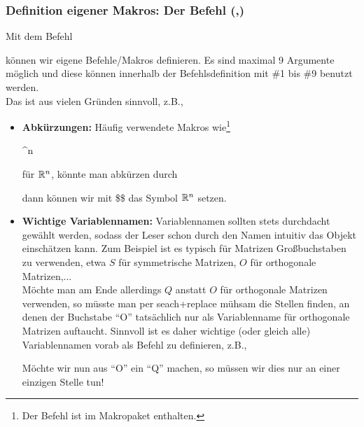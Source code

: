 \subsubsection{Definition eigener Makros: Der Befehl  (,)}
Mit dem Befehl
\begin{center}
\end{center}
können wir eigene Befehle/Makros definieren. Es sind maximal 9 Argumente möglich und diese können innerhalb der Befehlsdefinition mit \#1 bis \#9 benutzt werden. \\
Das ist aus vielen Gründen sinnvoll, z.B.,
\begin{itemize}
	\item \textbf{Abkürzungen:} Häufig verwendete Makros wie\footnote{Der Befehl  ist im Makropaket  enthalten.}
	\begin{center}
		\^{}n 
	\end{center}
	für ${\mathbb{R}}^{n}$, könnte man abkürzen durch
	\begin{center}
\end{center}	
	dann können wir mit \$\$ das Symbol ${\mathbb{R}}^{n}$ setzen.
	\item \textbf{Wichtige Variablennamen:} Variablennamen sollten stets durchdacht gewählt werden, sodass der Leser schon durch den Namen intuitiv das Objekt einschätzen kann. Zum Beispiel ist es typisch für Matrizen Großbuchstaben zu verwenden, etwa $S$ für symmetrische Matrizen, $O$ für orthogonale Matrizen,...\\
	Möchte man am Ende allerdings $Q$ anstatt $O$ für orthogonale Matrizen verwenden, so müsste man per seach+replace mühsam die Stellen finden, an denen der Buchstabe ``O'' tatsächlich nur als Variablenname für orthogonale Matrizen auftaucht. Sinnvoll ist es daher wichtige (oder gleich alle) Variablennamen vorab als Befehl zu definieren, z.B.,
		\begin{center}
	\end{center}
	Möchte wir nun aus ``O'' ein ``Q'' machen, so müssen wir dies nur an einer einzigen Stelle tun!
\end{itemize}









